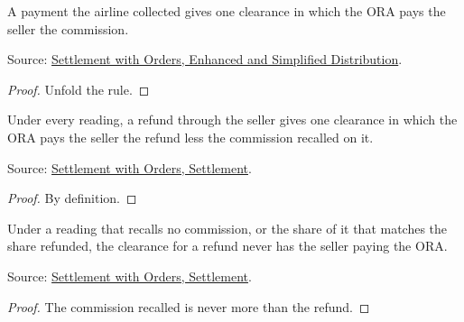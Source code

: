 \begin{theorem}
  \label{thm:accounting-airline-collected}
  A payment the airline collected gives one clearance in which the ORA pays
  the seller the commission.

  Source: \href{https://standards.atlassian.net/wiki/spaces/SWO/pages/574653091}{Settlement with Orders, Enhanced and Simplified Distribution}.
\end{theorem}
\begin{proof}
  Unfold the rule.
\end{proof}

\begin{theorem}
  \label{thm:accounting-refund-cleared}
  Under every reading, a refund through the seller gives one clearance in
  which the ORA pays the seller the refund less the commission recalled on
  it.

  Source: \href{https://standards.atlassian.net/wiki/spaces/SWO/pages/574816478}{Settlement with Orders, Settlement}.
\end{theorem}
\begin{proof}
  By definition.
\end{proof}

\begin{theorem}
  \label{thm:accounting-refund-nonneg-partial-recall}
  Under a reading that recalls no commission, or the share of it that
  matches the share refunded, the clearance for a refund never has the
  seller paying the ORA.

  Source: \href{https://standards.atlassian.net/wiki/spaces/SWO/pages/574816478}{Settlement with Orders, Settlement}.
\end{theorem}
\begin{proof}
  The commission recalled is never more than the refund.
\end{proof}

